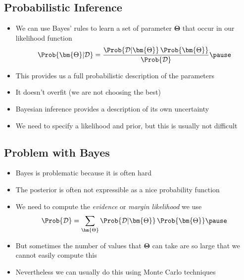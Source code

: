 
\begin{slide}
\section{Probabilistic Inference}

\begin{PauseHighLight}
  \begin{itemize}
  \item We can use Bayes' rules to learn a set of parameter
     $\bm{\Theta}$ that occur in our likelihood function
    \begin{align*}
      \Prob{\bm{\Theta}|\mathcal{D}} =
      \frac{\Prob{\mathcal{D}|\bm{\Theta}}\, \Prob{\bm{\Theta}}}{
      \Prob{\mathcal{D}} }\pause
    \end{align*}
  \item This provides us a full probabilistic description of the
    parameters\pause
  \item It doesn't overfit (we are not choosing the best)\pause
  \item Bayesian inference provides a description of its own
    uncertainty\pause
  \item We need to specify a likelihood and prior, but this is usually
    not difficult\pause
  \end{itemize}
\end{PauseHighLight}

\end{slide}


\begin{slide}
\section{Problem with Bayes}

\begin{PauseHighLight}
  \begin{itemize}
  \item Bayes is problematic because it is often hard\pause
  \item The posterior is often not expressible as a nice probability
    function\pause 
  \item We need to compute the \textit{evidence} or \textit{margin likelihood}
    we use
    \begin{align*}
      \Prob{\mathcal{D}} = \sum_{\bm{\Theta}}
      \Prob{\mathcal{D}|\bm{\Theta}}\, \Prob{\bm{\Theta}}\pause
    \end{align*}
  \item But sometimes the number of values that $\bm{\Theta}$ can take
    are so large that we cannot easily compute this\pause
  \item Nevertheless we can usually do this using Monte Carlo techniques\pause
  \end{itemize}
\end{PauseHighLight}

\end{slide}


